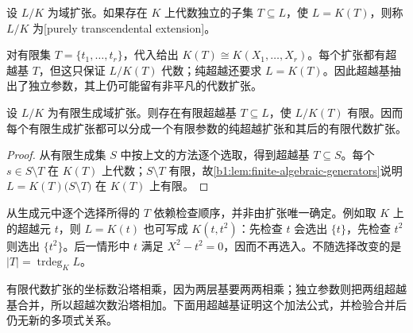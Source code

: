 \begin{definition}\label{b1:def:purely-transcendental}
	设 \(L/K\) 为域扩张。如果存在 \(K\) 上代数独立的子集 \(T\subseteq L\)，使 \(L=K(T)\)，则称 \(L/K\) 为[purely transcendental extension]。
\end{definition}
对有限集 \(T=\{t_1,\ldots,t_r\}\)，代入给出 \(K(T)\cong K(X_1,\ldots,X_r)\)。每个扩张都有超越基 \(T\)，但这只保证 \(L/K(T)\) 代数；纯超越还要求 \(L=K(T)\)。因此超越基抽出了独立参数，其上仍可能留有非平凡的代数扩张。

\begin{proposition}\label{b1:prop:finitely-generated-field-structure}
	设 \(L/K\) 为有限生成域扩张。则存在有限超越基 \(T\subseteq L\)，使 \(L/K(T)\) 有限。因而每个有限生成扩张都可以分成一个有限参数的纯超越扩张和其后的有限代数扩张。
\end{proposition}
\begin{proof}
	从有限生成集 \(S\) 中按上文的方法逐个选取，得到超越基 \(T\subseteq S\)。每个 \(s\in S\setminus T\) 在 \(K(T)\) 上代数；\(S\setminus T\) 有限，故\cref{b1:lem:finite-algebraic-generators}说明 \(L=K(T)\bigl(S\setminus T\bigr)\) 在 \(K(T)\) 上有限。
\end{proof}

从生成元中逐个选择所得的 \(T\) 依赖检查顺序，并非由扩张唯一确定。例如取 \(K\) 上的超越元 \(t\)，则 \(L=K(t)\) 也可写成 \(K(t,t^2)\)：先检查 \(t\) 会选出 \(\{t\}\)，先检查 \(t^2\) 则选出 \(\{t^2\}\)。后一情形中 \(t\) 满足 \(X^2-t^2=0\)，因而不再选入。不随选择改变的是 \(\lvert T\rvert=\operatorname{trdeg}_K L\)。

\ProseParagraphBreak
有限代数扩张的坐标数沿塔相乘，因为两层基要两两相乘；独立参数则把两组超越基合并，所以超越次数沿塔相加。下面用超越基证明这个加法公式，并检验合并后仍无新的多项式关系。

